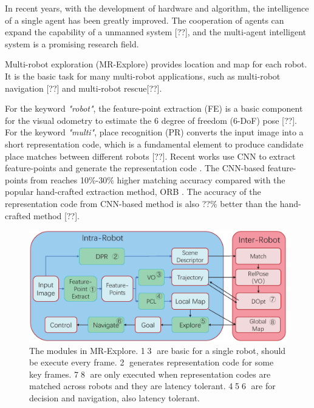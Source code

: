 \label{sec:intro}

In recent years, with the development of hardware and algorithm, the intelligence of a single agent has been greatly improved.
The cooperation of agents can expand the capability of a unmanned system [??], and the multi-agent intelligent system is a promising research field.

Multi-robot exploration (MR-Explore) provides location and map for each robot. It is the basic task for many multi-robot applications, such as multi-robot navigation [??] and multi-robot rescue[??].

For the keyword \textit{"robot"}, the feature-point extraction (FE) is a basic component for the visual odometry to estimate the 6 degree of freedom (6-DoF) pose [??].
For the keyword \textit{"multi"}, place recognition (PR) converts the input image into a short representation code, which is a fundamental element to produce candidate place matches between different robots [??].
Recent works use CNN to extract feature-points \cite{detone2018superpoint, simo2015discriminative, yi2016lift} and generate the representation code \cite{arandjelovic2016netvlad, radenovic2018fine}. 
The CNN-based feature-points from \cite{detone2018superpoint} reaches 10\%-30\% higher matching accuracy compared with the popular hand-crafted extraction method, ORB \cite{Mur-Artal:2017281}.
The accuracy of the representation code from CNN-based method \cite{radenovic2018fine} is also ??\% better than the hand-crafted method [??].

\begin{figure}[t]
	\centering
	\includegraphics[width=0.99\linewidth]{fig/maexp.eps}
    \caption{
        The modules in MR-Explore. \textcircled{1}\textcircled{3} are basic for a single robot, should be execute every frame. \textcircled{2} generates representation code for some key frames. \textcircled{7}\textcircled{8} are only executed when representation codes are matched across robots and they are latency tolerant.  \textcircled{4}\textcircled{5}\textcircled{6} are for decision and navigation, also latency tolerant.
    }
	\label{fig:maexp}
\end{figure}


